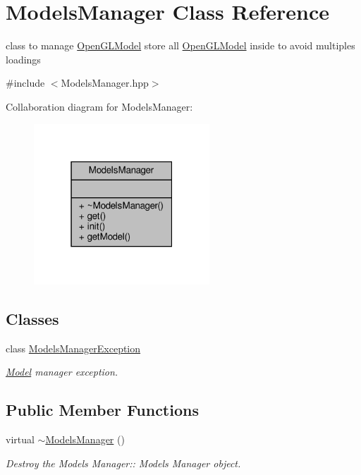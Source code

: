 \hypertarget{class_models_manager}{}\section{Models\+Manager Class Reference}
\label{class_models_manager}


class to manage \hyperlink{class_open_g_l_model}{Open\+G\+L\+Model} store all \hyperlink{class_open_g_l_model}{Open\+G\+L\+Model} inside to avoid multiples loadings  




{\ttfamily \#include $<$Models\+Manager.\+hpp$>$}



Collaboration diagram for Models\+Manager\+:
\nopagebreak
\begin{figure}[H]
\begin{center}
\leavevmode
\includegraphics[width=187pt]{class_models_manager__coll__graph}
\end{center}
\end{figure}
\subsection*{Classes}
\begin{DoxyCompactItemize}
\item 
class \hyperlink{class_models_manager_1_1_models_manager_exception}{Models\+Manager\+Exception}
\begin{DoxyCompactList}\small\item\em \hyperlink{class_model}{Model} manager exception. \end{DoxyCompactList}\end{DoxyCompactItemize}
\subsection*{Public Member Functions}
\begin{DoxyCompactItemize}
\item 
\mbox{\label{class_models_manager_a612ccb251eb4a59435bd6a2e643ba800}} 
virtual \hyperlink{class_models_manager_a612ccb251eb4a59435bd6a2e643ba800}{$\sim$\+Models\+Manager} ()
\begin{DoxyCompactList}\small\item\em Destroy the Models Manager\+:\+: Models Manager object. \end{DoxyCompactList}\end{DoxyCompactItemize}
